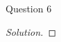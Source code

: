 \begin{solution}{Question 6}\label{ques:6}
    \begin{question}
    \end{question}
    \tcblower{}
    \begin{proof}[Solution]
    \end{proof}
\end{solution}
